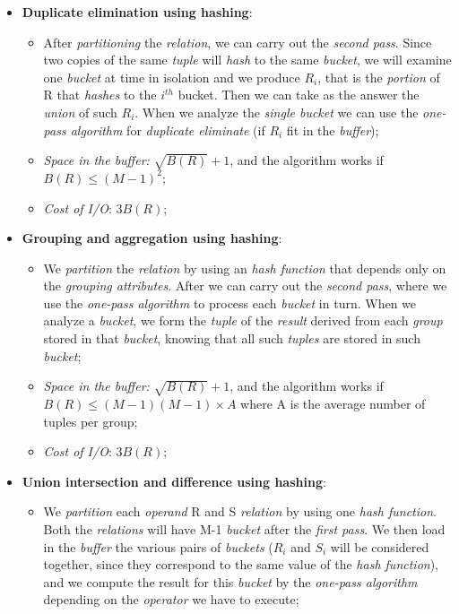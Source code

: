 \documentclass{article}
\begin{document}
\begin{itemize}
\item \textbf{Duplicate elimination using hashing}:
\begin{itemize}
\item After \emph{partitioning} the \emph{relation}, we can carry out the \emph{second pass}. Since two copies of the same \emph{tuple} will \emph{hash} to the same \emph{bucket}, we will examine one \emph{bucket} at time in isolation and we produce $R_i$, that is the \emph{portion} of R that \emph{hashes} to the $i^{th}$ bucket. Then we can take as the answer the \emph{union} of such $R_i$. When we analyze the \emph{single bucket} we can use the \emph{one-pass algorithm} for \emph{duplicate eliminate} (if $R_i$ fit in the \emph{buffer});
\item \emph{Space in the buffer:} $\sqrt{B(R)}+1$, and the algorithm works if $B(R) \leq (M-1)^2$;
\item \emph{Cost of I/O}: $3B(R)$;
\end{itemize}
\item \textbf{Grouping and aggregation using hashing}:
\begin{itemize}
\item We \emph{partition} the \emph{relation} by using an \emph{hash function} that depends only on the \emph{grouping attributes}. After we can carry out the \emph{second pass}, where we use the \emph{one-pass algorithm} to process each \emph{bucket} in turn. When we analyze a \emph{bucket}, we form the \emph{tuple} of the \emph{result} derived from each \emph{group} stored in that \emph{bucket}, knowing that all such \emph{tuples} are stored in such \emph{bucket};
\item \emph{Space in the buffer:} $\sqrt{B(R)}+1$, and the algorithm works if $B(R) \leq (M-1)(M-1) \times A$ where A is the average number of tuples per group;
\item \emph{Cost of I/O}: $3B(R)$;
\end{itemize}
\item \textbf{Union intersection and difference using hashing}:
\begin{itemize}
\item We \emph{partition} each \emph{operand} R and S \emph{relation} by using one \emph{hash function}. Both the \emph{relations} will have M-1 \emph{bucket} after the \emph{first pass}. We then load in the \emph{buffer} the various pairs of \emph{buckets} ($R_i$ and $S_i$ will be considered together, since they correspond to the same value of the \emph{hash function}), and we compute the result for this \emph{bucket} by the \emph{one-pass algorithm} depending on the \emph{operator} we have to execute;

\end{itemize}
\end{itemize}
\end{document}
